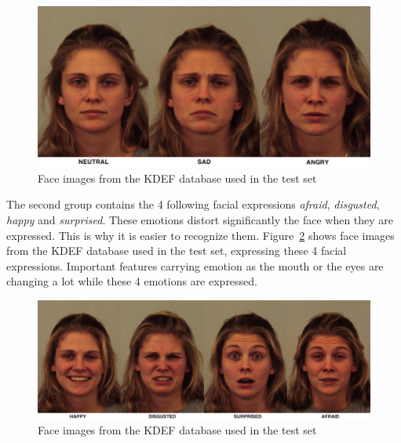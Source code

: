 \begin{figure}[!h]
\begin{center}
\noindent \includegraphics[scale=0.3]{figures/kdef_no_difference_emotions} 
\newline
\caption{Face images from the KDEF database used in the test set}
\label{kdef_no_difference_emotions}
\end{center} 
\end{figure}

\noindent The second group contains the 4 following facial expressions \textit{afraid}, \textit{disgusted}, \textit{happy} and \textit{surprised}. These emotions distort significantly the face when they are expressed. This is why it is easier to recognize them. Figure~\ref{kdef_difference_emotions} shows face images from the KDEF database used in the test set, expressing these 4 facial expressions. Important features carrying emotion as the mouth or the eyes are changing a lot while these 4 emotions are expressed.
\newline

\begin{figure}[!h]
\begin{center}
\noindent \includegraphics[scale=0.3]{figures/kdef_difference_emotions} 
\newline
\caption{Face images from the KDEF database used in the test set}
\label{kdef_difference_emotions}
\end{center} 
\end{figure}

